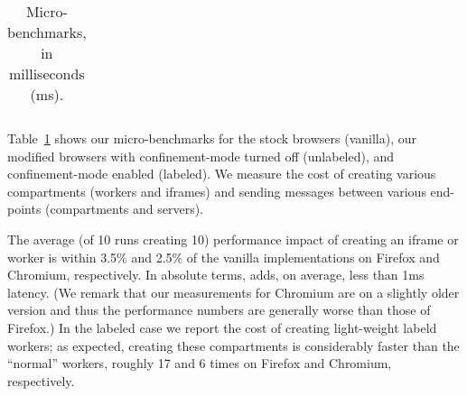 \begin{table}
{\begin{tabular}{l |c|c|c|c|c|c }
\\\bottomrule
\end{tabular}
}
\caption{Micro-benchmarks, in milliseconds (ms).}
\label{microbench} 
\end{table}

Table~\ref{microbench} shows our micro-benchmarks for the stock
browsers (vanilla), our modified browsers with confinement-mode turned
off (unlabeled), and confinement-mode enabled (labeled).
%
We measure the cost of creating various compartments (workers and
iframes) and sending messages between various end-points
(compartments and servers).

%
The average (of 10 runs creating 10) performance impact of creating an
iframe or worker is within 3.5\% and 2.5\% of the vanilla
implementations on Firefox and Chromium, respectively.
%
In absolute terms, \sys{} adds, on average, less than 1ms latency.
%
(We remark that our measurements for Chromium are on a slightly older
version and thus the performance numbers are generally worse than
those of Firefox.)
%
In the labeled case we report the cost of creating light-weight labeld
workers; as expected, creating these compartments is considerably
faster than the ``normal'' workers, roughly 17 and 6 times on Firefox
and Chromium, respectively.


